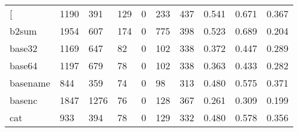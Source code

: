 \begin{longtable}{lp{2.0cm}p{2.0cm}p{2.0cm}p{2.0cm}p{2.0cm}p{2.0cm}p{2.0cm}p{2.0cm}p{2.0cm}}
\bottomrule
\endlastfoot
{[}         &                   1190 &                                391 &                               129 &                                0 &                               233 &                             437 &                                   0.541 &                                  0.671 &                                0.367 \\
b2sum     &                   1954 &                                607 &                               174 &                                0 &                               775 &                             398 &                                   0.523 &                                  0.689 &                                0.204 \\
base32    &                   1169 &                                647 &                                82 &                                0 &                               102 &                             338 &                                   0.372 &                                  0.447 &                                0.289 \\
base64    &                   1197 &                                679 &                                78 &                                0 &                               102 &                             338 &                                   0.363 &                                  0.433 &                                0.282 \\
basename  &                    844 &                                359 &                                74 &                                0 &                                98 &                             313 &                                   0.480 &                                  0.575 &                                0.371 \\
basenc    &                   1847 &                               1276 &                                76 &                                0 &                               128 &                             367 &                                   0.261 &                                  0.309 &                                0.199 \\
cat       &                    933 &                                394 &                                78 &                                0 &                               129 &                             332 &                                   0.480 &                                  0.578 &                                0.356 \\

\end{longtable}
